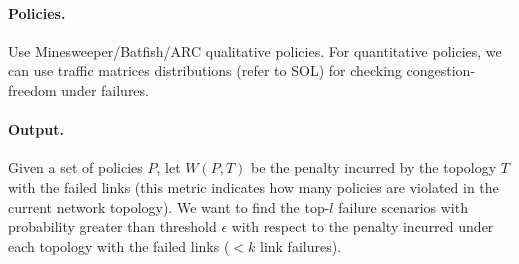 \documentclass[]{article}
\begin{document}
\paragraph{Policies.} Use Minesweeper/Batfish/ARC qualitative policies.
For quantitative policies, we can use traffic matrices distributions 
(refer to SOL) for checking congestion-freedom under failures. 

\paragraph{Output.} Given a set of policies $P$, let $W(P, T)$ 
be the penalty incurred by the topology $T$ with the failed links 
(this metric indicates how many policies are violated in the 
current network topology). We want to find the top-$l$ failure scenarios
with probability greater than threshold $\epsilon$ with respect to 
the penalty incurred under each topology with the failed links ($< k$ link
failures).

 
\begin{small}
	
\end{small}
\end{document}
